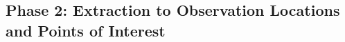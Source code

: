 \documentclass[letterpaper,12pt]{article}
\begin{document}















































\pagebreak
\subsection{Phase 2: Extraction to Observation Locations and Points of Interest}
\end{document}
